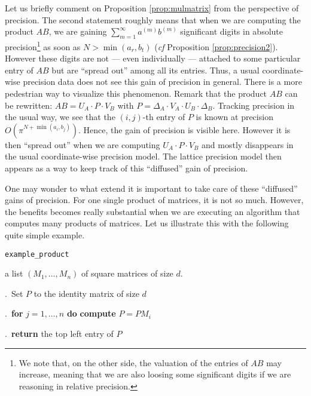 \documentclass{sig-alternate}
\begin{document}
Let us briefly comment on Proposition \ref{prop:mulmatrix} from the 
perspective of precision. The second statement roughly means that when 
we are computing the product $AB$, we are gaining $\sum_{m=1}^\infty 
a^{(m)} b^{(m)}$ significant digits in absolute precision\footnote{We 
note that, on the other side, the valuation of the entries of $AB$ may 
increase, meaning that we are also loosing some significant digits if we 
are reasoning in relative precision.} as soon as $N > \min(a_r, b_t)$ 
(\emph{cf} Proposition \ref{prop:precision2}). However these digits are 
not --- even individually --- attached to some particular entry of $AB$ 
but are ``spread out'' among all its entries. Thus, a usual 
coordinate-wise precision data does not see this gain of precision in 
general. There is a more pedestrian way to visualize this phenomenon. 
Remark that the product $AB$ can be rewritten:
$AB = U_A \cdot P \cdot V_B$ with
$P = \Delta_A \cdot V_A \cdot U_B \cdot \Delta_B$.
Tracking precision in the usual way, we see that the $(i,j)$-th entry
of $P$ is known at precision $O(\pi^{N + \min(a_i,b_j)})$. Hence, the 
gain of precision is visible here. However it is then ``spread out'' 
when we are computing $U_A \cdot P \cdot V_B$ and mostly disappears in 
the usual coordinate-wise precision model. The lattice precision model 
then appears as a way to keep track of this ``diffused'' gain of
precision.

\medskip

One may wonder to what extend it is important to take care of these 
``diffused'' gains of precision. For one single product of matrices, 
it is not so much. However, the benefits becomes really substantial
when we are executing an algorithm that computes many products of
matrices. Let us illustrate this with the following quite simple
example.

\noindent\hrulefill

 {\tt example\_product}

 a list $(M_1, \ldots, M_n)$ of square matrices
of size $d$.

\smallskip

.\ Set $P$ to the identity matrix of size $d$

.\ {\bf for} $j=1,\dots,n$ {\bf do} {\bf compute} $P = P M_i$

.\ {\bf return} the top left entry of $P$

\vspace{-1ex}\noindent\hrulefill
\end{document}

